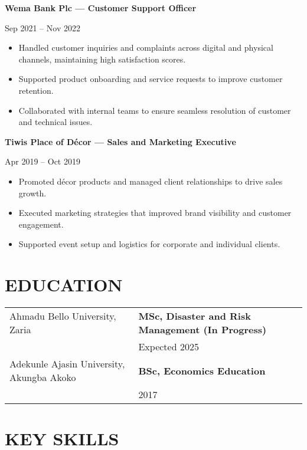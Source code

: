 \documentclass[a4paper,12pt]{article}
\newenvironment{joblong}[2]
{
  \vspace{4pt}
  \noindent
  \begin{minipage}[t]{0.75\textwidth}
    \textbf{#1}
  \end{minipage}%
  \hfill
  \begin{minipage}[t]{0.23\textwidth}
    \raggedleft #2
  \end{minipage}
  \vspace{2pt}
  \begin{itemize}[leftmargin=1em,itemsep=3pt,label=--,topsep=2pt]
}
{
  \end{itemize}
  \vspace{4pt}
}
\begin{document}
\begin{joblong}{Wema Bank Plc — Customer Support Officer}{Sep 2021 -- Nov 2022}
\item Handled customer inquiries and complaints across digital and physical channels, maintaining high satisfaction scores.
\item Supported product onboarding and service requests to improve customer retention.
\item Collaborated with internal teams to ensure seamless resolution of customer and technical issues.
\end{joblong}

\begin{joblong}{Tiwis Place of Décor — Sales and Marketing Executive}{Apr 2019 -- Oct 2019}
\item Promoted décor products and managed client relationships to drive sales growth.
\item Executed marketing strategies that improved brand visibility and customer engagement.
\item Supported event setup and logistics for corporate and individual clients.
\end{joblong}


\section{EDUCATION}

\begin{tabularx}{\linewidth}{@{}l X@{}}
Ahmadu Bello University, Zaria & \textbf{MSc, Disaster and Risk Management (In Progress)} \\
                               & Expected 2025 \\[10pt]
Adekunle Ajasin University, Akungba Akoko & \textbf{BSc, Economics Education} \\
                               & 2017 \\[10pt]
\end{tabularx}


\section{KEY SKILLS}
\end{document}
